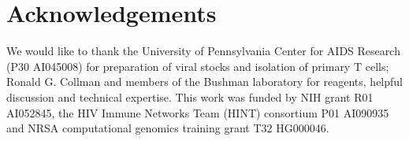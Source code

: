 \documentclass[../sherrill-Mix_thesis.tex]{subfiles}
\begin{document}
\section{Acknowledgements}
  We would like to thank the University of Pennsylvania Center for AIDS Research (P30 AI045008) for preparation of viral stocks and isolation of primary \cdFour{} T cells; Ronald G. Collman and members of the Bushman laboratory for reagents, helpful discussion and technical expertise. This work was funded by NIH grant R01 AI052845, the HIV Immune Networks Team (HINT) consortium P01 AI090935 and NRSA computational genomics training grant T32 HG000046.  




\end{document}
